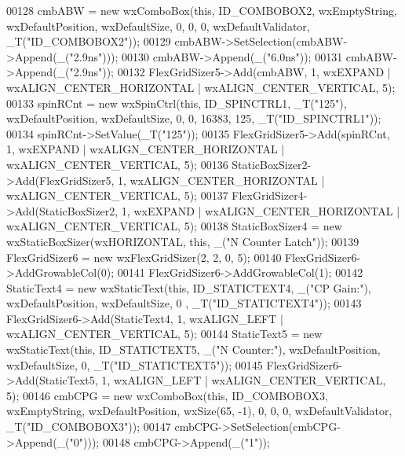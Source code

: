 \begin{DoxyCode}
00128     cmbABW = \textcolor{keyword}{new} wxComboBox(\textcolor{keyword}{this}, ID\_COMBOBOX2, wxEmptyString, wxDefaultPosition, wxDefaultSize, 0, 0, 0, 
      wxDefaultValidator, \_T(\textcolor{stringliteral}{"ID\_COMBOBOX2"}));
00129     cmbABW->SetSelection(cmbABW->Append(\_(\textcolor{stringliteral}{"2.9ns"})));
00130     cmbABW->Append(\_(\textcolor{stringliteral}{"6.0ns"}));
00131     cmbABW->Append(\_(\textcolor{stringliteral}{"2.9ns"}));
00132     FlexGridSizer5->Add(cmbABW, 1, wxEXPAND | wxALIGN\_CENTER\_HORIZONTAL | wxALIGN\_CENTER\_VERTICAL, 5);
00133     spinRCnt = \textcolor{keyword}{new} wxSpinCtrl(\textcolor{keyword}{this}, ID\_SPINCTRL1, \_T(\textcolor{stringliteral}{"125"}), wxDefaultPosition, wxDefaultSize, 0, 0, 16383,
       125, \_T(\textcolor{stringliteral}{"ID\_SPINCTRL1"}));
00134     spinRCnt->SetValue(\_T(\textcolor{stringliteral}{"125"}));
00135     FlexGridSizer5->Add(spinRCnt, 1, wxEXPAND | wxALIGN\_CENTER\_HORIZONTAL | wxALIGN\_CENTER\_VERTICAL, 5);
00136     StaticBoxSizer2->Add(FlexGridSizer5, 1, wxALIGN\_CENTER\_HORIZONTAL | wxALIGN\_CENTER\_VERTICAL, 5);
00137     FlexGridSizer4->Add(StaticBoxSizer2, 1, wxEXPAND | wxALIGN\_CENTER\_HORIZONTAL | wxALIGN\_CENTER\_VERTICAL,
       5);
00138     StaticBoxSizer4 = \textcolor{keyword}{new} wxStaticBoxSizer(wxHORIZONTAL, \textcolor{keyword}{this}, \_(\textcolor{stringliteral}{"N Counter Latch"}));
00139     FlexGridSizer6 = \textcolor{keyword}{new} wxFlexGridSizer(2, 2, 0, 5);
00140     FlexGridSizer6->AddGrowableCol(0);
00141     FlexGridSizer6->AddGrowableCol(1);
00142     StaticText4 = \textcolor{keyword}{new} wxStaticText(\textcolor{keyword}{this}, ID\_STATICTEXT4, \_(\textcolor{stringliteral}{"CP Gain:"}), wxDefaultPosition, wxDefaultSize, 0
      , \_T(\textcolor{stringliteral}{"ID\_STATICTEXT4"}));
00143     FlexGridSizer6->Add(StaticText4, 1, wxALIGN\_LEFT | wxALIGN\_CENTER\_VERTICAL, 5);
00144     StaticText5 = \textcolor{keyword}{new} wxStaticText(\textcolor{keyword}{this}, ID\_STATICTEXT5, \_(\textcolor{stringliteral}{"N Counter:"}), wxDefaultPosition, wxDefaultSize,
       0, \_T(\textcolor{stringliteral}{"ID\_STATICTEXT5"}));
00145     FlexGridSizer6->Add(StaticText5, 1, wxALIGN\_LEFT | wxALIGN\_CENTER\_VERTICAL, 5);
00146     cmbCPG = \textcolor{keyword}{new} wxComboBox(\textcolor{keyword}{this}, ID\_COMBOBOX3, wxEmptyString, wxDefaultPosition, wxSize(65, -1), 0, 0, 0, 
      wxDefaultValidator, \_T(\textcolor{stringliteral}{"ID\_COMBOBOX3"}));
00147     cmbCPG->SetSelection(cmbCPG->Append(\_(\textcolor{stringliteral}{"0"})));
00148     cmbCPG->Append(\_(\textcolor{stringliteral}{"1"}));

\end{DoxyCode}
